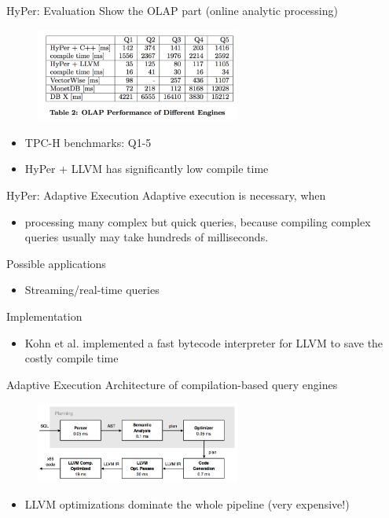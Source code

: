 \begin{frame}{HyPer: Evaluation}
Show the OLAP part (online analytic processing)
\begin{figure}[htb]
\includegraphics[width=0.6\textwidth]{fig/hyper-table2.png}
\end{figure}
\begin{itemize}
\item TPC-H benchmarks: Q1-5
\item HyPer + LLVM has significantly low compile time
\end{itemize}
\end{frame}


\begin{frame}{HyPer: Adaptive Execution}
Adaptive execution is necessary, when
\begin{itemize}
\item processing many complex but quick queries, because compiling complex
      queries usually may take hundreds of milliseconds.
\end{itemize}
\pause
Possible applications
\begin{itemize}
\item Streaming/real-time queries
\end{itemize}
\pause
Implementation
\begin{itemize}
\item Kohn et al. implemented a fast bytecode interpreter for LLVM to save the costly compile time
\end{itemize}
\end{frame}

\begin{frame}{Adaptive Execution}
Architecture of compilation-based query engines
\begin{figure}[htb]
\includegraphics[width=0.6\textwidth]{fig/adaptive-fig1.png}
\end{figure}
\begin{itemize}
\item LLVM optimizations dominate the whole pipeline (very expensive!)
\end{itemize}
\end{frame}

